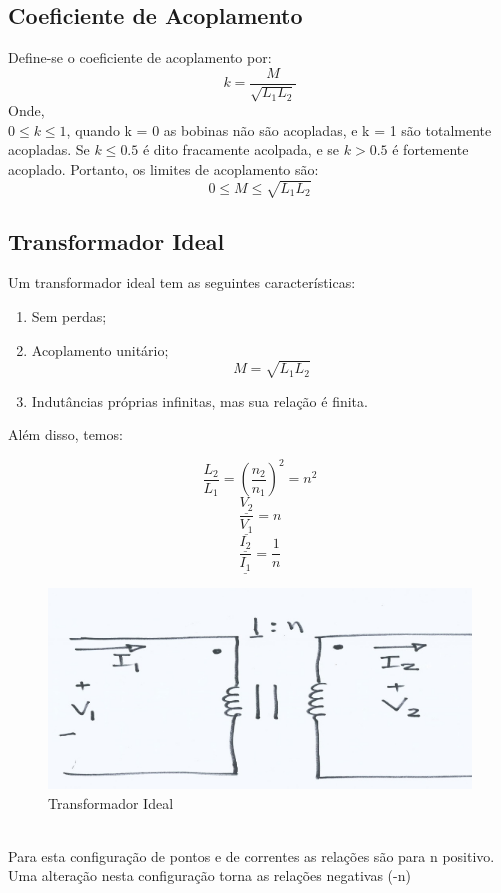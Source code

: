 \documentclass[a4paper, 12pt]{article}
\begin{document}
	\subsection{Coeficiente de Acoplamento}
		Define-se o coeficiente de acoplamento por:
		\begin{equation}
			k = \frac{M}{\sqrt{L_1L_2}}
		\end{equation}
		Onde, \\
		$0 \leq k \leq 1$, quando k = 0 as bobinas não são acopladas, e k = 1 são totalmente acopladas.
		Se $k \leq 0.5$ é dito fracamente acolpada, e se $k > 0.5$ é fortemente acoplado. Portanto, os limites de acoplamento são:
		\begin{equation}
			0 \leq M \leq \sqrt{L_1L_2}
		\end{equation}

	\subsection{Transformador Ideal}
		Um transformador ideal tem as seguintes características:
		\begin{enumerate}
			\item Sem perdas;
			\item Acoplamento unitário;
				\begin{equation}
					M = \sqrt{L_1L_2}
				\end{equation}
			\item Indutâncias próprias infinitas, mas sua relação é finita.
		\end{enumerate}
		Além disso, temos:
			
			\begin{equation}
				\frac{L_2}{L_1} = (\frac{n_2}{n_1})^2 = n^2
			\end{equation}
			\begin{equation}
				\frac{\underline{V_2}}{\underline{V_1}} = n
			\end{equation}
			\begin{equation}
				\frac{\underline{I_2}}{\underline{I_1}} = \frac{1}{n}
			\end{equation}
			\begin{figure}[h]
				\centering
				\includegraphics[scale=0.4]{a18.png}
				\caption{Transformador Ideal}
			\end{figure}\\
Para esta configuração de pontos e de correntes as relações são para n positivo. Uma alteração nesta configuração torna as relações negativas (-n)
\newpage
\end{document}
